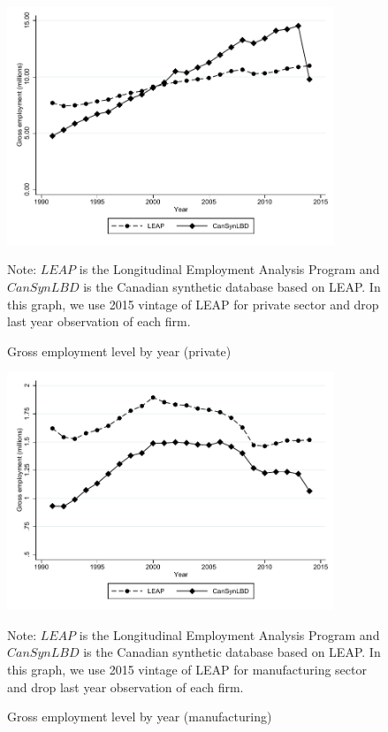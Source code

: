 \documentclass{article}
\begin{document}
\begin{figure} [H]
\centering
\caption{Gross employment level by year (private)} \label{GrossEmploymentPrivate}
\includegraphics[height=2.8in, width=.7\linewidth]{graphs/Gross_employment_level_by_year_private_bw.pdf} 
\begin{minipage}{0.85\textwidth}
{\footnotesize Note: $LEAP$ is the Longitudinal Employment Analysis Program and $CanSynLBD$ is the Canadian synthetic database based on LEAP. In this graph, we use 2015 vintage of LEAP for private sector and drop last year observation of each firm.  \par}
\end{minipage}
\end{figure}



\begin{figure} [H]
\centering
\caption{Gross employment level by year (manufacturing)} \label{GrossEmploymentManufacturing}
\includegraphics[height=2.8in, width=.7\linewidth]{graphs/Gross_employment_level_by_year_manufacturing_bw.pdf} 
\begin{minipage}{0.85\textwidth}
{\footnotesize Note: $LEAP$ is the Longitudinal Employment Analysis Program and $CanSynLBD$ is the Canadian synthetic database based on LEAP. In this graph, we use 2015 vintage of LEAP for manufacturing sector and drop last year observation of each firm. \par}
\end{minipage}
\end{figure}
\end{document}
